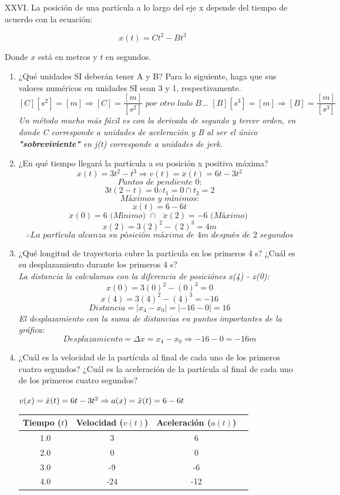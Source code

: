 \documentclass{article}
\begin{document}
\newpage
XXVI. La posición de una partícula a lo largo del eje x depende del tiempo de acuerdo con la ecuación:

\[x(t) = Ct^2 - Bt^3\]

\noindent Donde \(x\) está en metros y \(t\) en segundos.

\begin{enumerate}
  \item ¿Qué unidades SI deberán tener A y B? Para lo siguiente, haga que sus valores numéricos en unidades SI sean 3 y 1, respectivamente.
  \[
  [C][s^2] = [m] \Rightarrow [C] =  \frac{[m]}{[s^2]} \textit{  por otro lado B...  }
  [B][s^3] = [m] \Rightarrow [B] =  \frac{[m]}{[s^3]}
  \]
  \textit{Un método mucho más fácil es con la derivada de segundo y tercer orden, en donde C corresponde a unidades de aceleración y B al ser el único \textbf{"sobreviviente"} en j(t) corresponde a unidades de jerk.}
  
  \item ¿En qué tiempo llegará la partícula a su posición x positiva máxima? \\
  \[  x(t) = 3t^2 - t^3 \Rightarrow v(t) = \dot{x}(t) = 6t - 3t^2  \]
  \[ \textit{Puntos de pendiente 0:} \]
  \[ 3t (2-t) = 0 \therefore t_1 = 0 \cap t_2 = 2 \]
  \[ \textit{Máximos y mínimos:} \]
  \[ \ddot{x}(t) = 6 - 6t \]
  \[ \ddot{x}(0) = 6 \textit{  (Mínimo)  } \cap \textit{  }\ddot{x}(2) = -6 \textit{  (Máximo)  } \]
  \[ x(2) = 3(2)^2 - (2)^3 = 4m \]
  \[ \therefore \textit{La partícula alcanza su pósición máxima de 4m después de 2 segundos} \]
  
  
  \item ¿Qué longitud de trayectoria cubre la partícula en los primeros 4 s? ¿Cuál es su desplazamiento durante los primeros 4 s?\\
  \textit{La distancia la calculamos con la diferencia de posiciónes x(4) - x(0):}
  \[x(0) = 3(0)^2 - (0)^3 = 0\]
  \[x(4) = 3(4)^2 - (4)^3 = -16\]
  \[Distancia = |x_4-x_0| = |-16 - 0| = 16\]
  \textit{El desplazamiento con la suma de distancias en puntos importantes de la gráfica:}
  \[  Desplazamiento = \Delta x = x_4 - x_0 \Rightarrow -16 - 0 = -16m  \]
  \item ¿Cuál es la velocidad de la partícula al final de cada uno de los primeros cuatro segundos? ¿Cuál es la aceleración de la partícula al final de cada uno de los primeros cuatro segundos?

\begin{center}
\(
v(x) = \dot{x}(t) = 6t - 3t^2 \Rightarrow a(x) = \ddot{x}(t) = 6 - 6t\\
\)
  \begin{tabular}{|c|c|c|c|}
    \hline
    Tiempo (\(t\)) & Velocidad (\(v(t)\)) & Aceleración (\(a(t)\)) \\
    \hline
    1.0 & 3 & 6 \\
    2.0 & 0 & 0 \\
    3.0 & -9 & -6 \\
    4.0 & -24 & -12 \\
    \hline
  \end{tabular}
\end{center}


\end{enumerate}
\end{document}
